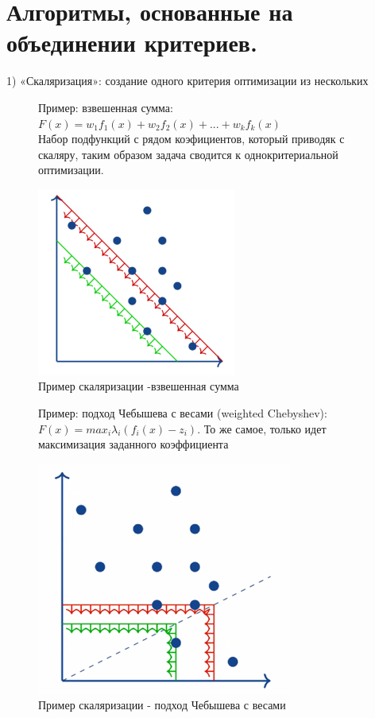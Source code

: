 \section{Алгоритмы, основанные на объединении критериев.}
1) «Скаляризация»: создание одного критерия оптимизации из нескольких
\begin{figure}[h]
Пример: взвешенная сумма: $F(x) = w_{1}f_{1}(x) + w_{2}f_{2}(x) + ...+ w_{k} f_{k} (x)$\\
Набор подфункций с рядом коэфициентов, который приводяк с скаляру, таким образом задача сводится к однокритериальной оптимизации.
\begin{center}
    \includegraphics[width=0.35\linewidth]{images/Scalar.PNG}
    \caption{Пример скаляризации -взвешенная сумма}
    \label{fig:mpr}
\end{center}
\end{figure}
\begin{figure}[h]
Пример: подход Чебышева с весами (weighted Chebyshev):\\
$F(x) = max_{i} λ_{i}(f_{i}(x) − z_{i})$. То же самое, только идет максимизация заданного коэффициента
\begin{center}
    \includegraphics[width=0.35\linewidth]{images/Scalar_Chebyshev.PNG}
    \caption{Пример скаляризации - подход Чебышева с весами}
    \label{fig:mpr}
\end{center}
\end{figure}

